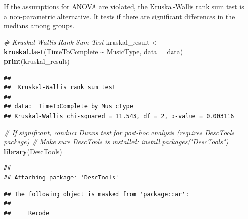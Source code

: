 \documentclass[
]{article}
\newenvironment{Shaded}{\begin{snugshade}}{\end{snugshade}}
\newcommand{\AttributeTok}[1]{\textcolor[rgb]{0.13,0.29,0.53}{#1}}
\newcommand{\CommentTok}[1]{\textcolor[rgb]{0.56,0.35,0.01}{\textit{#1}}}
\newcommand{\ControlFlowTok}[1]{\textcolor[rgb]{0.13,0.29,0.53}{\textbf{#1}}}
\newcommand{\FloatTok}[1]{\textcolor[rgb]{0.00,0.00,0.81}{#1}}
\newcommand{\FunctionTok}[1]{\textcolor[rgb]{0.13,0.29,0.53}{\textbf{#1}}}
\newcommand{\NormalTok}[1]{#1}
\newcommand{\OtherTok}[1]{\textcolor[rgb]{0.56,0.35,0.01}{#1}}
\newcommand{\SpecialCharTok}[1]{\textcolor[rgb]{0.81,0.36,0.00}{\textbf{#1}}}
\newcommand{\StringTok}[1]{\textcolor[rgb]{0.31,0.60,0.02}{#1}}
\begin{document}
If the assumptions for ANOVA are violated, the Kruskal-Wallis rank sum
test is a non-parametric alternative. It tests if there are significant
differences in the medians among groups.

\begin{Shaded}
\begin{Highlighting}[]
\CommentTok{\# Kruskal{-}Wallis Rank Sum Test}
\NormalTok{kruskal\_result }\OtherTok{\textless{}{-}} \FunctionTok{kruskal.test}\NormalTok{(TimeToComplete }\SpecialCharTok{\textasciitilde{}}\NormalTok{ MusicType, }\AttributeTok{data =}\NormalTok{ data)}
\FunctionTok{print}\NormalTok{(kruskal\_result)}
\end{Highlighting}
\end{Shaded}

\begin{verbatim}
## 
##  Kruskal-Wallis rank sum test
## 
## data:  TimeToComplete by MusicType
## Kruskal-Wallis chi-squared = 11.543, df = 2, p-value = 0.003116
\end{verbatim}

\begin{Shaded}
\begin{Highlighting}[]
\CommentTok{\# If significant, conduct Dunn\textquotesingle{}s test for post{-}hoc analysis (requires DescTools package)}
\CommentTok{\# Make sure DescTools is installed: install.packages("DescTools")}
\FunctionTok{library}\NormalTok{(DescTools)}
\end{Highlighting}
\end{Shaded}

\begin{verbatim}
## 
## Attaching package: 'DescTools'
\end{verbatim}

\begin{verbatim}
## The following object is masked from 'package:car':
## 
##     Recode
\end{verbatim}

\begin{Shaded}
\end{Shaded}
\end{document}

